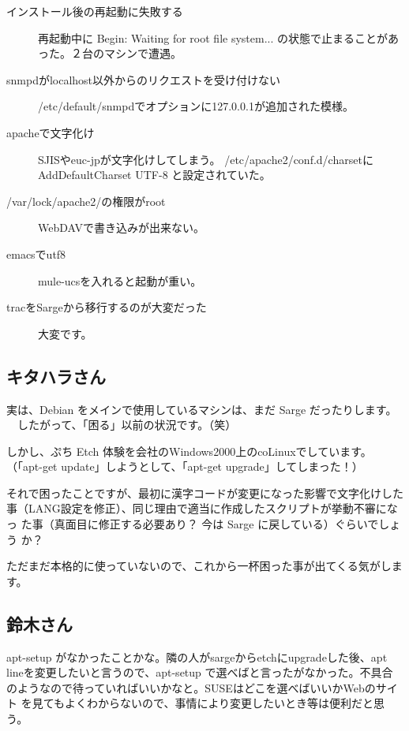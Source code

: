 \documentclass[mingoth,a4paper]{jsarticle}
\begin{document}
\begin{description}
 \item[インストール後の再起動に失敗する]
 再起動中に
 Begin: Waiting for root file system...
 の状態で止まることがあった。２台のマシンで遭遇。

 \item[snmpdがlocalhost以外からのリクエストを受け付けない]
 /etc/default/snmpdでオプションに127.0.0.1が追加された模様。

 \item[apacheで文字化け]
 SJISやeuc-jpが文字化けしてしまう。
 /etc/apache2/conf.d/charsetに
 AddDefaultCharset UTF-8
 と設定されていた。

 \item[/var/lock/apache2/の権限がroot]
 WebDAVで書き込みが出来ない。

 \item[emacsでutf8]
 mule-ucsを入れると起動が重い。

 \item[tracをSargeから移行するのが大変だった]
 大変です。
\end{description}

\subsection{キタハラさん}

実は、Debian をメインで使用しているマシンは、まだ Sarge だったりします。
　したがって、「困る」以前の状況です。（笑）

しかし、ぷち Etch 体験を会社のWindows2000上のcoLinuxでしています。
（「apt-get update」しようとして、「apt-get upgrade」してしまった！）

それで困ったことですが、最初に漢字コードが変更になった影響で文字化けした
事（LANG設定を修正）、同じ理由で適当に作成したスクリプトが挙動不審になっ
た事（真面目に修正する必要あり？ 今は Sarge に戻している）ぐらいでしょう
か？

ただまだ本格的に使っていないので、これから一杯困った事が出てくる気がしま
す。

\subsection{鈴木さん}

apt-setup がなかったことかな。隣の人がsargeからetchにupgradeした後、apt
lineを変更したいと言うので、apt-setup で選べばと言ったがなかった。不具合
のようなので待っていればいいかなと。SUSEはどこを選べばいいかWebのサイト
を見てもよくわからないので、事情により変更したいとき等は便利だと思う。
\end{document}
